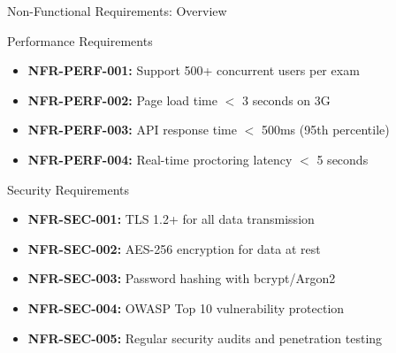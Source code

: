 \begin{frame}{Non-Functional Requirements: Overview}
    \begin{block}{Performance Requirements}
        \begin{itemize}
            \item \textbf{NFR-PERF-001:} Support 500+ concurrent users per exam
            \item \textbf{NFR-PERF-002:} Page load time $<$ 3 seconds on 3G
            \item \textbf{NFR-PERF-003:} API response time $<$ 500ms (95th percentile)
            \item \textbf{NFR-PERF-004:} Real-time proctoring latency $<$ 5 seconds
        \end{itemize}
    \end{block}
    
    \begin{block}{Security Requirements}
        \begin{itemize}
            \item \textbf{NFR-SEC-001:} TLS 1.2+ for all data transmission
            \item \textbf{NFR-SEC-002:} AES-256 encryption for data at rest
            \item \textbf{NFR-SEC-003:} Password hashing with bcrypt/Argon2
            \item \textbf{NFR-SEC-004:} OWASP Top 10 vulnerability protection
            \item \textbf{NFR-SEC-005:} Regular security audits and penetration testing
        \end{itemize}
    \end{block}
\end{frame}

